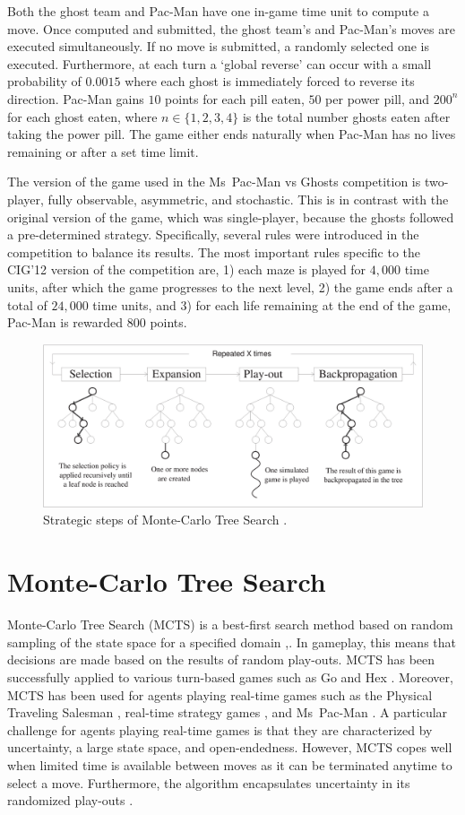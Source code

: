 \documentclass[journal]{IEEEtran}
\begin{document}
Both the ghost team and Pac-Man have one in-game time unit to compute a move. Once computed and submitted, the ghost team's and Pac-Man's moves are executed simultaneously. If no move is submitted, a randomly selected one is executed. Furthermore, at each turn a `global reverse' can occur with a small probability of $0.0015$ where each ghost is immediately forced to reverse its direction. Pac-Man gains $10$ points for each pill eaten, $50$ per power pill, and $200^n$ for each ghost eaten, where $n\in \{ 1, 2 , 3, 4 \}$ is the total number ghosts eaten after taking the power pill. The game either ends naturally when Pac-Man has no lives remaining or after a set time limit.

The version of the game used in the Ms~Pac-Man vs Ghosts competition is two-player, fully observable, asymmetric, and stochastic. This is in contrast with the original version of the game, which was single-player, because the ghosts followed a pre-determined strategy. Specifically, several rules were introduced in the competition to balance its results. The most important rules specific to the CIG'12 version of the competition are, 1) each maze is played for $4,000$ time units, after which the game progresses to the next level, 2) the game ends after a total of $24,000$ time units, and 3) for each life remaining at the end of the game, Pac-Man is rewarded $800$ points. 

\begin{figure}[ht]
	\centering
	\includegraphics[width=.46\textwidth]{img/figure1.eps}
	\caption{Strategic steps of Monte-Carlo Tree Search \cite{chaslot2008progressive}.}
	\label{fig:mcts-algorithm}
\end{figure}
\section{Monte-Carlo Tree Search}
\label{MCTS}
Monte-Carlo Tree Search (MCTS) is a best-first search method based on random sampling of the state space for a specified domain \cite{kocsis2006bandit},\cite{coulom2007efficient}. In gameplay, this means that decisions are made based on the results of random play-outs. MCTS has been successfully applied to various turn-based games such as Go \cite{lee2010current} and Hex \cite{arneson2010monte}. Moreover, MCTS has been used for agents playing real-time games such as the Physical Traveling Salesman  \cite{powleytsp}, real-time strategy games \cite{balla2009uct}, and Ms~Pac-Man \cite{ikehata2011monte}. A particular challenge for agents playing real-time games is that they are  characterized by uncertainty, a large state space, and open-endedness. However, MCTS copes well when limited time is available between moves as it can be terminated anytime to select a move. Furthermore, the algorithm encapsulates uncertainty in its randomized play-outs \cite{brownesurvey}.
\end{document}
